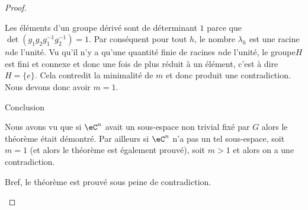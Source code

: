\begin{proof}
\begin{subproof}
        Les éléments d'un groupe dérivé sont de déterminant \( 1\) parce que \( \det(g_1g_2g_1^{-1}g_2^{-1})=1\). Par conséquent pour tout \( h\), le nombre \( \lambda_h\) est une racine \( n\)\ieme de l'unité. Vu qu'il n'y a qu'une quantité finie de racines \( n\)\ieme de l'unité, le groupe\( H\) est fini et connexe et donc une fois de plus réduit à un élément, c'est à dire \( H=\{ e \}\). Cela contredit la minimalité de \( m\) et donc produit une contradiction. Nous devons donc avoir \( m=1\).

    \item[Conclusion]

        Nous avons vu que si \( \eC^n\) avait un sous-espace non trivial fixé par \( G\) alors le théorème était démontré. Par ailleurs si \( \eC^n\) n'a pas un tel sous-espace, soit \( m=1\) (et alors le théorème est également prouvé), soit \( m>1\) et alors on a une contradiction.

        Bref, le théorème est prouvé sous peine de contradiction.

    \end{subproof}

\end{proof}
